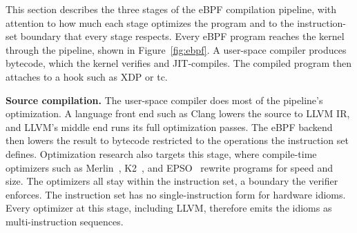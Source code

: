 This section describes the three stages of the eBPF compilation pipeline, with attention to how much each stage optimizes the program and to the instruction-set boundary that every stage respects.
Every eBPF program reaches the kernel through the pipeline, shown in Figure~\ref{fig:ebpf}.
A user-space compiler produces bytecode, which the kernel verifies and JIT-compiles.
The compiled program then attaches to a hook such as XDP or tc.



\noindent\textbf{Source compilation.}
The user-space compiler does most of the pipeline's optimization.
A language front end such as Clang lowers the source to LLVM IR, and LLVM's middle end runs its full optimization passes.
The eBPF backend then lowers the result to bytecode restricted to the operations the instruction set defines.
Optimization research also targets this stage, where compile-time optimizers such as Merlin~\cite{mao2024merlin}, K2~\cite{xu2021synthesizing}, and EPSO~\cite{zhu2025epso} rewrite programs for speed and size.
The optimizers all stay within the instruction set, a boundary the verifier enforces.
The instruction set has no single-instruction form for hardware idioms.
Every optimizer at this stage, including LLVM, therefore emits the idioms as multi-instruction sequences.

